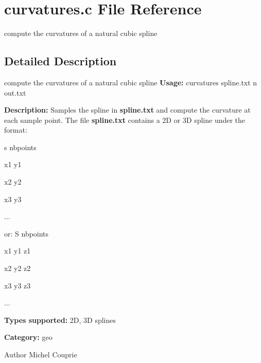 \section{curvatures.c File Reference}
\label{curvatures_8c}


compute the curvatures of a natural cubic spline  




\subsection{Detailed Description}
compute the curvatures of a natural cubic spline {\bfseries Usage:} curvatures spline.txt n out.txt

{\bfseries Description:} Samples the spline in {\bfseries spline.txt} and compute the curvature at each sample point. The file {\bfseries spline.txt} contains a 2D or 3D spline under the format:\par
 s nbpoints\par
 x1 y1\par
 x2 y2\par
 x3 y3\par
 ...\par
 or: S nbpoints\par
 x1 y1 z1\par
 x2 y2 z2\par
 x3 y3 z3\par
 ...\par


{\bfseries Types supported:} 2D, 3D splines

{\bfseries Category:} geo

\begin{DoxyAuthor}{Author}
Michel Couprie 
\end{DoxyAuthor}

